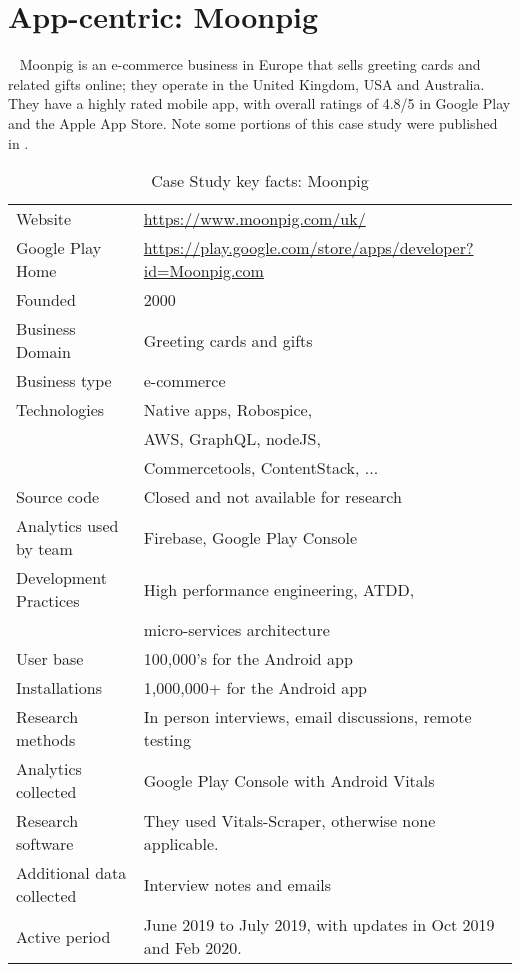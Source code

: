 \section{App-centric: Moonpig}~\label{case-study-overview-moonpig}
Moonpig is an e-commerce business in Europe that sells greeting cards and related gifts online; they operate in the United Kingdom, USA and Australia. They have a highly rated mobile app, with overall ratings of 4.8/5 in Google Play and the Apple App Store. Note some portions of this case study were published in \citep{harty_better_android_apps_using_android_vitals}.

{\renewcommand{\arraystretch}{0.8}%
\begin{table}[htbp!]
    \centering
    \small
    \setlength{\tabcolsep}{6pt}
    \begin{tabular}{lp{9cm}}
       \toprule
       Website &\url{https://www.moonpig.com/uk/} \\
       Google Play Home & \url{https://play.google.com/store/apps/developer?id=Moonpig.com} \\
       Founded &2000 \\
       Business Domain & Greeting cards and gifts \\
       Business type & e-commerce \\
       Technologies  & Native apps, Robospice, \\
       & AWS, GraphQL, nodeJS, \\
       & Commercetools, ContentStack, ... \\
       Source code  &Closed and not available for research \\
       Analytics used by team &Firebase, Google Play Console \\
       Development Practices & High performance engineering, ATDD, \\
         & micro-services architecture \\
       \midrule
       User base &100,000's for the Android app\\
       Installations &1,000,000+ for the Android app\\
       \midrule
       Research methods &In person interviews, email discussions, remote testing \\
       Analytics collected &Google Play Console with Android Vitals \\
       Research software &They used Vitals-Scraper, otherwise none applicable.\\
       Additional data collected &Interview notes and emails \\
       Active period &June 2019 to July 2019, with updates in Oct 2019 and Feb 2020. \\
       \bottomrule
    \end{tabular}
    \caption{Case Study key facts: Moonpig}
    \label{tab:moonpig_anaytics_overview}
\end{table}
}

